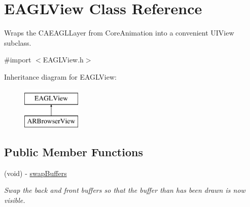 \hypertarget{interface_e_a_g_l_view}{
\section{EAGLView Class Reference}
\label{interface_e_a_g_l_view}
}


Wraps the CAEAGLLayer from CoreAnimation into a convenient UIView subclass.  




{\ttfamily \#import $<$EAGLView.h$>$}

Inheritance diagram for EAGLView:\begin{figure}[H]
\begin{center}
\leavevmode
\includegraphics[height=2.000000cm]{interface_e_a_g_l_view}
\end{center}
\end{figure}
\subsection*{Public Member Functions}
\begin{DoxyCompactItemize}
\item 
(void) -\/ \hyperlink{interface_e_a_g_l_view_a9e6bb4e8a5bb54ecffb384abcc154504}{swapBuffers}
\begin{DoxyCompactList}\small\item\em Swap the back and front buffers so that the buffer than has been drawn is now visible. \end{DoxyCompactList}\end{DoxyCompactItemize}

